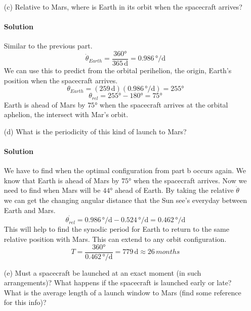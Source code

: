 \documentclass{article}
\begin{document}
{\begin{enumerate}
		\clearpage
		
		\boldmath
		\item[(c)] Relative to Mars, where is Earth in its orbit when the spacecraft arrives? 
		\paragraph{Solution} Similar to the previous part. \unboldmath
		\[
			\dot{\theta}_{Earth} = \frac{\ang{360}}{\num{365} \, \unit{\day}} = \num{0.986} \, \unit{\degree\per\day}
		\]
		We can use this to predict from the orbital perihelion, the origin, Earth's position when the spacecraft arrives.
		\[
			\theta_{Earth} = (\num{259} \, \unit{\day})(\num{0.986} \, \unit{\degree\per\day}) = \ang{255}
		\]
		\[
			\theta_{rel} = \ang{255} - \ang{180} = \ang{75}
		\]
		Earth is ahead of Mars by $\ang{75}$ when the spacecraft arrives at the orbital aphelion, the intersect with Mar's orbit.
		
		
		\boldmath
		\item[(d)] What is the periodicity of this kind of launch to Mars? 
		\paragraph{Solution} We have to find when the optimal configuration from part b occurs again. We know that Earth is ahead of Mars by $\ang{75}$ when the spacecraft arrives. Now we need to find when Mars will be $\ang{44}$ ahead of Earth. By taking the relative $\dot{\theta}$ we can get the changing angular distance that the Sun see's everyday between Earth and Mars. \unboldmath
		\[
			\dot{\theta_{rel}} = \num{0.986} \, \unit{\degree\per\day} - \num{0.524} \, \unit{\degree\per\day} = \num{0.462} \, \unit{\degree\per\day}
		\]
		This will help to find the synodic period for Earth to return to the same relative position with Mars. This can extend to any orbit configuration.
		\[
			T = \frac{\ang{360}}{\num{0.462} \, \unit{\degree\per\day}} = \num{779} \, \unit{\day} \approx \num{26} \, \unit{months}
		\]
		
		
		\item[(e)] Must a spacecraft be launched at an exact moment (in such arrangements)? What happens if the spacecraft is launched early or late? What is the average length of a launch window to Mars (find some reference for this info)? 

\end{enumerate}}
\end{document}
